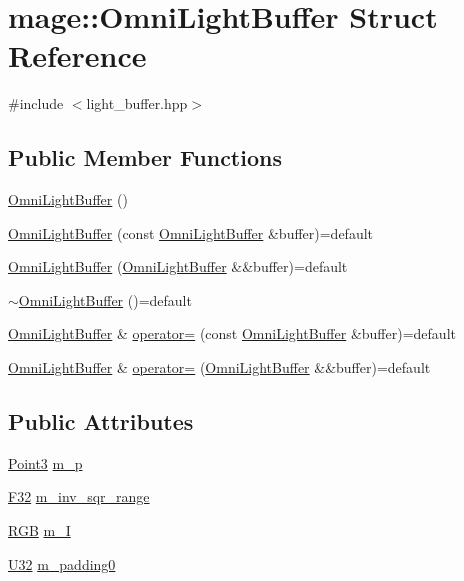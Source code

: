 \hypertarget{structmage_1_1_omni_light_buffer}{}\section{mage\+:\+:Omni\+Light\+Buffer Struct Reference}
\label{structmage_1_1_omni_light_buffer}


{\ttfamily \#include $<$light\+\_\+buffer.\+hpp$>$}

\subsection*{Public Member Functions}
\begin{DoxyCompactItemize}
\item 
\hyperlink{structmage_1_1_omni_light_buffer_a2cb95cb8ba07182d04b610b1c4c49be1}{Omni\+Light\+Buffer} ()
\item 
\hyperlink{structmage_1_1_omni_light_buffer_a199a9a711584abfe7576037ea479eccd}{Omni\+Light\+Buffer} (const \hyperlink{structmage_1_1_omni_light_buffer}{Omni\+Light\+Buffer} \&buffer)=default
\item 
\hyperlink{structmage_1_1_omni_light_buffer_a78c5a4066af4c60cf5579245d5f08f56}{Omni\+Light\+Buffer} (\hyperlink{structmage_1_1_omni_light_buffer}{Omni\+Light\+Buffer} \&\&buffer)=default
\item 
\hyperlink{structmage_1_1_omni_light_buffer_a80869a9637c8b3a40ee6da63b247faed}{$\sim$\+Omni\+Light\+Buffer} ()=default
\item 
\hyperlink{structmage_1_1_omni_light_buffer}{Omni\+Light\+Buffer} \& \hyperlink{structmage_1_1_omni_light_buffer_afc27989dfccb6bc8b58be462d35b989e}{operator=} (const \hyperlink{structmage_1_1_omni_light_buffer}{Omni\+Light\+Buffer} \&buffer)=default
\item 
\hyperlink{structmage_1_1_omni_light_buffer}{Omni\+Light\+Buffer} \& \hyperlink{structmage_1_1_omni_light_buffer_ae089377a7ddd063042848a360f2e0f49}{operator=} (\hyperlink{structmage_1_1_omni_light_buffer}{Omni\+Light\+Buffer} \&\&buffer)=default
\end{DoxyCompactItemize}
\subsection*{Public Attributes}
\begin{DoxyCompactItemize}
\item 
\hyperlink{structmage_1_1_point3}{Point3} \hyperlink{structmage_1_1_omni_light_buffer_a777b98a686a7e39bd7b401748629d9fc}{m\+\_\+p}
\item 
\hyperlink{namespacemage_aa97e833b45f06d60a0a9c4fc22ae02c0}{F32} \hyperlink{structmage_1_1_omni_light_buffer_a156d844a76bb2a98859263128740a95b}{m\+\_\+inv\+\_\+sqr\+\_\+range}
\item 
\hyperlink{structmage_1_1_r_g_b}{R\+GB} \hyperlink{structmage_1_1_omni_light_buffer_a795c9e5f251fb30ec8b0896062b020a7}{m\+\_\+I}
\item 
\hyperlink{namespacemage_a41c104c036fba3756a74e19f793eeaa1}{U32} \hyperlink{structmage_1_1_omni_light_buffer_af75a020722cd8eb37b91fe42a5b0ad5c}{m\+\_\+padding0}
\end{DoxyCompactItemize}


